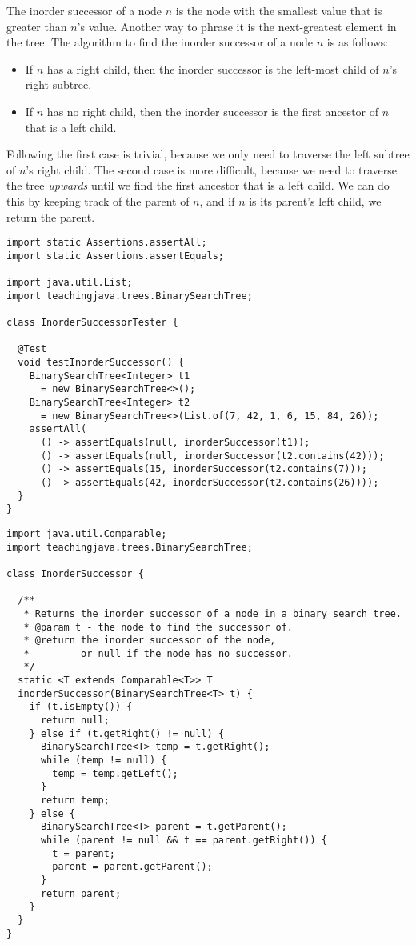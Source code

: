The inorder successor of a node $n$ is the node with the smallest value that is greater than $n$'s value. 
Another way to phrase it is the next-greatest element in the tree.
The algorithm to find the inorder successor of a node $n$ is as follows:
\begin{itemize}
  \item If $n$ has a right child, then the inorder successor is the left-most child of $n$'s right subtree.
  \item If $n$ has no right child, then the inorder successor is the first ancestor of $n$ that is a left child.
\end{itemize}
Following the first case is trivial, because we only need to traverse the left subtree of $n$'s right child. 
The second case is more difficult, because we need to traverse the tree \emph{upwards} until we find the first ancestor that is a left child. 
We can do this by keeping track of the parent of $n$, and if $n$ is its parent's left child, we return the parent.


\begin{lstlisting}[language=MyJava]
import static Assertions.assertAll;
import static Assertions.assertEquals;

import java.util.List;
import teachingjava.trees.BinarySearchTree;

class InorderSuccessorTester {

  @Test
  void testInorderSuccessor() {
    BinarySearchTree<Integer> t1 
      = new BinarySearchTree<>();
    BinarySearchTree<Integer> t2 
      = new BinarySearchTree<>(List.of(7, 42, 1, 6, 15, 84, 26));
    assertAll(
      () -> assertEquals(null, inorderSuccessor(t1));
      () -> assertEquals(null, inorderSuccessor(t2.contains(42)));
      () -> assertEquals(15, inorderSuccessor(t2.contains(7)));
      () -> assertEquals(42, inorderSuccessor(t2.contains(26))));
  }
}
\end{lstlisting}

\begin{lstlisting}[language=MyJava]
import java.util.Comparable;
import teachingjava.trees.BinarySearchTree;

class InorderSuccessor {

  /**
   * Returns the inorder successor of a node in a binary search tree.
   * @param t - the node to find the successor of.
   * @return the inorder successor of the node, 
   *         or null if the node has no successor.
   */
  static <T extends Comparable<T>> T 
  inorderSuccessor(BinarySearchTree<T> t) {
    if (t.isEmpty()) {
      return null;
    } else if (t.getRight() != null) {
      BinarySearchTree<T> temp = t.getRight();
      while (temp != null) {
        temp = temp.getLeft();
      }
      return temp;
    } else {
      BinarySearchTree<T> parent = t.getParent();
      while (parent != null && t == parent.getRight()) {
        t = parent;
        parent = parent.getParent();
      }
      return parent;
    }
  }
}
\end{lstlisting}

